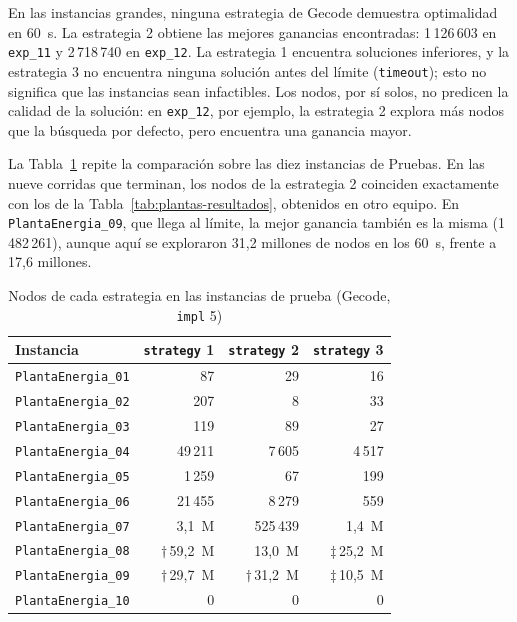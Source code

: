 En las instancias grandes, ninguna estrategia de Gecode demuestra optimalidad en 60~s. La estrategia 2 obtiene las mejores ganancias encontradas: 1\,126\,603 en \texttt{exp\_11} y 2\,718\,740 en \texttt{exp\_12}. La estrategia 1 encuentra soluciones inferiores, y la estrategia 3 no encuentra ninguna solución antes del límite (\texttt{timeout}); esto no significa que las instancias sean infactibles. Los nodos, por sí solos, no predicen la calidad de la solución: en \texttt{exp\_12}, por ejemplo, la estrategia 2 explora más nodos que la búsqueda por defecto, pero encuentra una ganancia mayor.

La Tabla~\ref{tab:plantas-estrategias-pruebas} repite la comparación sobre las diez instancias de Pruebas. En las nueve corridas que terminan, los nodos de la estrategia 2 coinciden exactamente con los de la Tabla~\ref{tab:plantas-resultados}, obtenidos en otro equipo. En \texttt{PlantaEnergia\_09}, que llega al límite, la mejor ganancia también es la misma (1\,482\,261), aunque aquí se exploraron 31,2 millones de nodos en los 60~s, frente a 17,6 millones.

\begin{table}[htbp]
    \caption{Nodos de cada estrategia en las instancias de prueba (Gecode, \texttt{impl} 5)}
    \label{tab:plantas-estrategias-pruebas}
    \small
    \begin{tabular}{@{}lrrr@{}}
        \toprule
        Instancia & \texttt{strategy} 1 & \texttt{strategy} 2 & \texttt{strategy} 3 \\
        \midrule
        \texttt{PlantaEnergia\_01} & 87 & 29 & 16 \\
        \texttt{PlantaEnergia\_02} & 207 & 8 & 33 \\
        \texttt{PlantaEnergia\_03} & 119 & 89 & 27 \\
        \texttt{PlantaEnergia\_04} & 49\,211 & 7\,605 & 4\,517 \\
        \texttt{PlantaEnergia\_05} & 1\,259 & 67 & 199 \\
        \texttt{PlantaEnergia\_06} & 21\,455 & 8\,279 & 559 \\
        \texttt{PlantaEnergia\_07} & 3,1~M & 525\,439 & 1,4~M \\
        \texttt{PlantaEnergia\_08} & $\dagger$\,59,2~M & 13,0~M & $\ddagger$\,25,2~M \\
        \texttt{PlantaEnergia\_09} & $\dagger$\,29,7~M & $\dagger$\,31,2~M & $\ddagger$\,10,5~M \\
        \texttt{PlantaEnergia\_10} & 0 & 0 & 0 \\
        \bottomrule
    \end{tabular}
\end{table}

